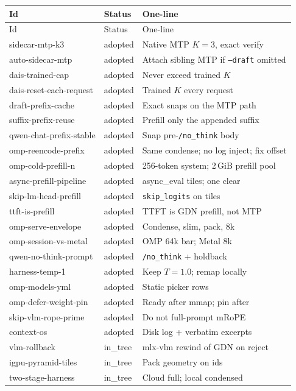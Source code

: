 {\small
\begin{longtable}{@{}p{4.0cm}lp{8.4cm}@{}}
\toprule
Id & Status & One-line \\
\midrule
\endfirsthead
\toprule
Id & Status & One-line \\
\midrule
\endhead
sidecar-mtp-k3 & adopted & Native MTP $K{=}3$, exact verify \\
auto-sidecar-mtp & adopted & Attach sibling MTP if \texttt{--draft} omitted \\
dais-trained-cap & adopted & Never exceed trained $K$ \\
dais-reset-each-request & adopted & Trained $K$ every request \\
draft-prefix-cache & adopted & Exact snaps on the MTP path \\
suffix-prefix-reuse & adopted & Prefill only the appended suffix \\
qwen-chat-prefix-stable & adopted & Snap pre-\texttt{/no\_think} body \\
omp-reencode-prefix & adopted & Same condense; no log inject; fix offset \\
omp-cold-prefill-n & adopted & 256-token system; 2\,GiB prefill pool \\
async-prefill-pipeline & adopted & async\_eval tiles; one clear \\
skip-lm-head-prefill & adopted & \texttt{skip\_logits} on tiles \\
ttft-is-prefill & adopted & TTFT is GDN prefill, not MTP \\
omp-serve-envelope & adopted & Condense, slim, pack, 8k \\
omp-session-vs-metal & adopted & OMP 64k bar; Metal 8k \\
qwen-no-think-prompt & adopted & \texttt{/no\_think} + holdback \\
harness-temp-1 & adopted & Keep $T{=}1.0$; remap locally \\
omp-models-yml & adopted & Static picker rows \\
omp-defer-weight-pin & adopted & Ready after mmap; pin after \\
skip-vlm-rope-prime & adopted & Do not full-prompt mRoPE \\
context-os & adopted & Disk log + verbatim excerpts \\
vlm-rollback & in\_tree & mlx-vlm rewind of GDN on reject \\
igpu-pyramid-tiles & in\_tree & Pack geometry on ids \\
two-stage-harness & in\_tree & Cloud full; local condensed \\

\end{longtable}}
